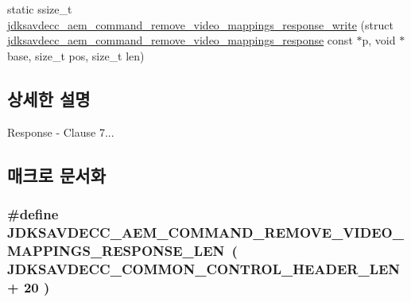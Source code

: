 \begin{DoxyCompactItemize}
\item 
static ssize\+\_\+t \hyperlink{group__command__remove__video__mappings__response_gae056489c217399094da15d7520072f17}{jdksavdecc\+\_\+aem\+\_\+command\+\_\+remove\+\_\+video\+\_\+mappings\+\_\+response\+\_\+write} (struct \hyperlink{structjdksavdecc__aem__command__remove__video__mappings__response}{jdksavdecc\+\_\+aem\+\_\+command\+\_\+remove\+\_\+video\+\_\+mappings\+\_\+response} const $\ast$p, void $\ast$base, size\+\_\+t pos, size\+\_\+t len)
\end{DoxyCompactItemize}


\subsection{상세한 설명}
Response -\/ Clause 7... 

\subsection{매크로 문서화}
\subsubsection[{\texorpdfstring{J\+D\+K\+S\+A\+V\+D\+E\+C\+C\+\_\+\+A\+E\+M\+\_\+\+C\+O\+M\+M\+A\+N\+D\+\_\+\+R\+E\+M\+O\+V\+E\+\_\+\+V\+I\+D\+E\+O\+\_\+\+M\+A\+P\+P\+I\+N\+G\+S\+\_\+\+R\+E\+S\+P\+O\+N\+S\+E\+\_\+\+L\+EN}{JDKSAVDECC_AEM_COMMAND_REMOVE_VIDEO_MAPPINGS_RESPONSE_LEN}}]{\setlength{\rightskip}{0pt plus 5cm}\#define J\+D\+K\+S\+A\+V\+D\+E\+C\+C\+\_\+\+A\+E\+M\+\_\+\+C\+O\+M\+M\+A\+N\+D\+\_\+\+R\+E\+M\+O\+V\+E\+\_\+\+V\+I\+D\+E\+O\+\_\+\+M\+A\+P\+P\+I\+N\+G\+S\+\_\+\+R\+E\+S\+P\+O\+N\+S\+E\+\_\+\+L\+EN~( {\bf J\+D\+K\+S\+A\+V\+D\+E\+C\+C\+\_\+\+C\+O\+M\+M\+O\+N\+\_\+\+C\+O\+N\+T\+R\+O\+L\+\_\+\+H\+E\+A\+D\+E\+R\+\_\+\+L\+EN} + 20 )}\hypertarget{group__command__remove__video__mappings__response_gacb5495d81e47c52e609b619e18067a38}{}\label{group__command__remove__video__mappings__response_gacb5495d81e47c52e609b619e18067a38}


